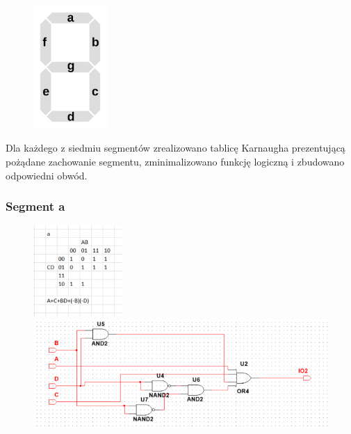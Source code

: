 \documentclass[12pt,a4paper]{article}
\begin{document}
\begin{figure}[H]
\centering
\includegraphics[width=0.25\textwidth]{7seg/segconf}
\end{figure}

Dla każdego z siedmiu segmentów zrealizowano tablicę Karnaugha prezentującą pożądane zachowanie segmentu, zminimalizowano funkcję logiczną i zbudowano odpowiedni obwód.

\subsubsection{Segment a}
\begin{figure}[H]
\centering
\includegraphics[width=0.3\textwidth]{7seg/seg0}
\includegraphics[width=\textwidth]{7seg/seg0circ}
\end{figure}

\newpage
\end{document}
